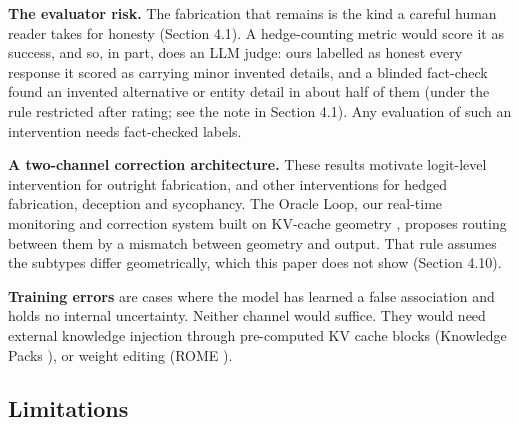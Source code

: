 \documentclass[11pt,letterpaper]{article}
\DeclareRobustCommand{\_}{\textunderscore\allowbreak}
\begin{document}
\textbf{The evaluator risk.} The fabrication that remains is the kind a careful human reader takes for honesty (Section 4.1). A hedge-counting metric would score it as success, and so, in part, does an LLM judge: ours labelled as honest every response it scored as carrying minor invented details, and a blinded fact-check found an invented alternative or entity detail in about half of them (under the rule restricted after rating; see the note in Section 4.1). Any evaluation of such an intervention needs fact-checked labels.

\textbf{A two-channel correction architecture.} These results motivate logit-level intervention for outright fabrication, and other interventions for hedged fabrication, deception and sycophancy. The Oracle Loop, our real-time monitoring and correction system built on KV-cache geometry \cite{edrington2026oracle}, proposes routing between them by a mismatch between geometry and output. That rule assumes the subtypes differ geometrically, which this paper does not show (Section 4.10).

\textbf{Training errors} are cases where the model has learned a false association and holds no internal uncertainty. Neither channel would suffice. They would need external knowledge injection through pre-computed KV cache blocks (Knowledge Packs \cite{pustovit2026knowledge}), or weight editing (ROME \cite{meng2022locating}).

\hypertarget{limitations}{%
\subsection{Limitations}\label{limitations}}
\end{document}
